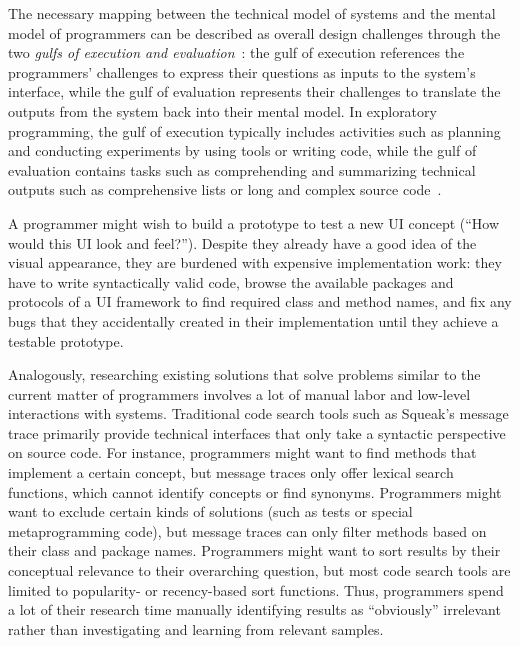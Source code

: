 The necessary mapping between the technical model of systems and the mental model of programmers can be described as overall design challenges through the two \emph{gulfs of execution and evaluation}~\cite{norman1986cognitive}:
the gulf of execution references the programmers' challenges to express their questions as inputs to the system's interface, while the gulf of evaluation represents their challenges to translate the outputs from the system back into their mental model.
In exploratory programming, the gulf of execution typically includes activities such as planning and conducting experiments by using tools or writing code, while the gulf of evaluation contains tasks such as comprehending and summarizing technical outputs such as comprehensive lists or long and complex source code~\cite{rein2020empirical}.

\begin{example}[5]
	\label{ex:background/challenges}
	A programmer might wish to build a prototype to test a new UI concept (``How would this UI look and feel?'').
	Despite they already have a good idea of the visual appearance, they are burdened with expensive implementation work:
	they have to write syntactically valid code, browse the available packages and protocols of a UI framework to find required class and method names, and fix any bugs that they accidentally created in their implementation until they achieve a testable prototype.

	Analogously, researching existing solutions that solve problems similar to the current matter of programmers involves a lot of manual labor and low-level interactions with systems.
	Traditional code search tools such as Squeak's message trace primarily provide technical interfaces that only take a syntactic perspective on source code.
	For instance, programmers might want to find methods that implement a certain concept, but message traces only offer lexical search functions,  which cannot identify concepts or find synonyms.
	Programmers might want to exclude certain kinds of solutions (such as tests or special metaprogramming code), but message traces can only filter methods based on their class and package names.
	Programmers might want to sort results by their conceptual relevance to their overarching question, but most code search tools are limited to popularity- or recency-based sort functions.
	Thus, programmers spend a lot of their research time manually identifying results as ``obviously'' irrelevant rather than investigating and learning from relevant samples.
\end{example}

